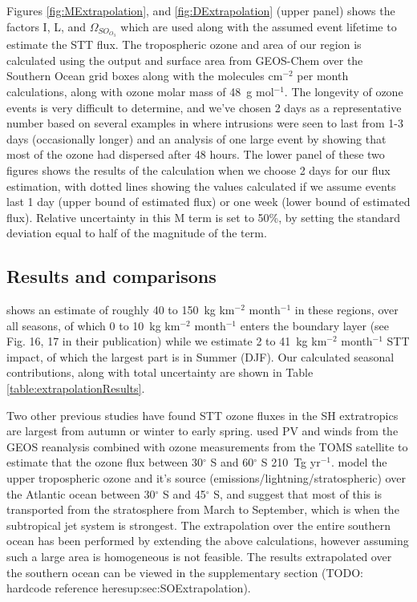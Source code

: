 \documentclass[acp, manuscript]{copernicus} %
\begin{document}
    Figures \ref{fig:MExtrapolation}, and \ref{fig:DExtrapolation} (upper panel) shows the factors I, L, and $\Omega_{SO_{O_3}}$ which are used along with the assumed event lifetime to estimate the STT flux.
    The tropospheric ozone and area of our region is calculated using the output and surface area from GEOS-Chem over the Southern Ocean grid boxes along with the molecules cm$^{-2}$ per month calculations, along with ozone molar mass of 48~g mol$^{-1}$.
    The longevity of ozone events is very difficult to determine, and we've chosen 2 days as a representative number based on several examples in \cite{Lin2012} where intrusions were seen to last from 1-3 days (occasionally longer) and an analysis of one large event by \cite{Cooper2004} showing that most of the ozone had dispersed after 48 hours.
    The lower panel of these two figures shows the results of the calculation when we choose 2 days for our flux estimation, with dotted lines showing the values calculated if we assume events last 1 day (upper bound of estimated flux) or one week (lower bound of estimated flux).
    Relative uncertainty in this M term is set to 50\%, by setting the standard deviation equal to half of the magnitude of the term.
  
  \subsection{Results and comparisons}
    \cite{Skerlak2014} shows an estimate of roughly 40 to 150~kg km$^{-2}$ month$^{-1}$ in these regions, over all seasons, of which 0 to 10~kg km$^{-2}$ month$^{-1}$ enters the boundary layer (see Fig. 16, 17 in their publication) while we estimate 2 to 41~kg km$^{-2}$ month$^{-1}$ STT impact, of which the largest part is in Summer (DJF).
    Our calculated seasonal contributions, along with total uncertainty are shown in Table \ref{table:extrapolationResults}.
    
    Two other previous studies have found STT ozone fluxes in the SH extratropics are largest from autumn or winter to early spring.
    \citet{Olsen2003} used PV and winds from the GEOS reanalysis combined with ozone measurements from the TOMS satellite to estimate that the ozone flux between 30$^{\circ}$ S and 60$^{\circ}$ S 210~Tg yr$^{-1}$.
    \citet{Liu2016} model the upper tropospheric ozone and it's source (emissions/lightning/stratospheric) over the Atlantic ocean between 30$^{\circ}$ S and 45$^{\circ}$ S, and suggest that most of this is transported from the stratosphere from March to September, which is when the subtropical jet system is strongest.
    The extrapolation over the entire southern ocean has been performed by extending the above calculations, however assuming such a large area is homogeneous is not feasible.
    The results extrapolated over the southern ocean can be viewed in the supplementary section (TODO: hardcode reference here{sup:sec:SOExtrapolation}).
  
\end{document}
